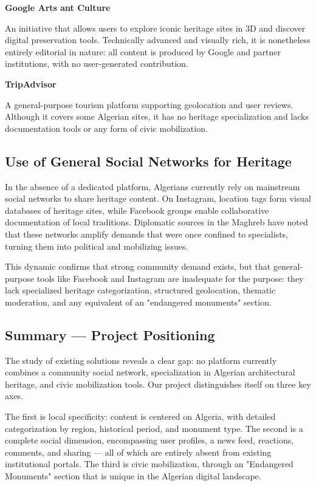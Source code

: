 \documentclass[12pt]{article}
\begin{document}
\textbf{Google Arts ant Culture}

An initiative that allows users to explore iconic heritage sites in 3D and discover digital preservation tools. Technically advanced and visually rich, it is nonetheless entirely editorial in nature: all content is produced by Google and partner institutions, with no user-generated contribution.

\textbf{TripAdvisor}

A general-purpose tourism platform supporting geolocation and user reviews. Although it covers some Algerian sites, it has no heritage specialization and lacks documentation tools or any form of civic mobilization.

\subsection{Use of General Social Networks for Heritage}
In the absence of a dedicated platform, Algerians currently rely on mainstream social networks to share heritage content. On Instagram, location tags form visual databases of heritage sites, while Facebook groups enable collaborative documentation of local traditions. Diplomatic sources in the Maghreb have noted that these networks amplify demands that were once confined to specialists, turning them into political and mobilizing issues.

This dynamic confirms that strong community demand exists, but that general-purpose tools like Facebook and Instagram are inadequate for the purpose: they lack specialized heritage categorization, structured geolocation, thematic moderation, and any equivalent of an "endangered monuments" section.
\subsection{Summary — Project Positioning}

The study of existing solutions reveals a clear gap: no platform currently combines a community social network, specialization in Algerian architectural heritage, and civic mobilization tools. Our project distinguishes itself on three key axes.

The first is local specificity: content is centered on Algeria, with detailed categorization by region, historical period, and monument type. The second is a complete social dimension, encompassing user profiles, a news feed, reactions, comments, and sharing — all of which are entirely absent from existing institutional portals. The third is civic mobilization, through an "Endangered Monuments" section that is unique in the Algerian digital landscape.
\end{document}
